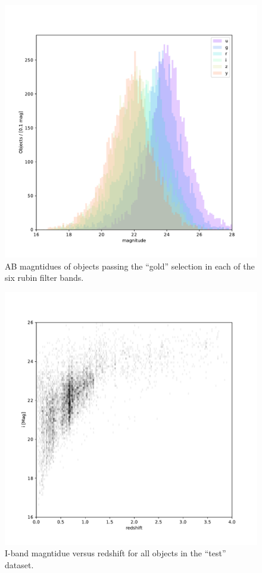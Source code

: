 \begin{figure}
    \centering
    \includegraphics[width=\linewidth]{figures/mags.pdf}
    \caption{AB magntidues of objects passing the ``gold'' selection in each of the six rubin filter bands.} 
    \label{fig:dp_mags}
\end{figure}

\begin{figure}
    \centering
    \includegraphics[width=\linewidth]{figures/mag_i_v_redshift.pdf}
    \caption{I-band magntidue versus redshift for all objects in the ``test'' dataset.}
    \label{fig:dp_mag_i_v_redshift}
\end{figure}

